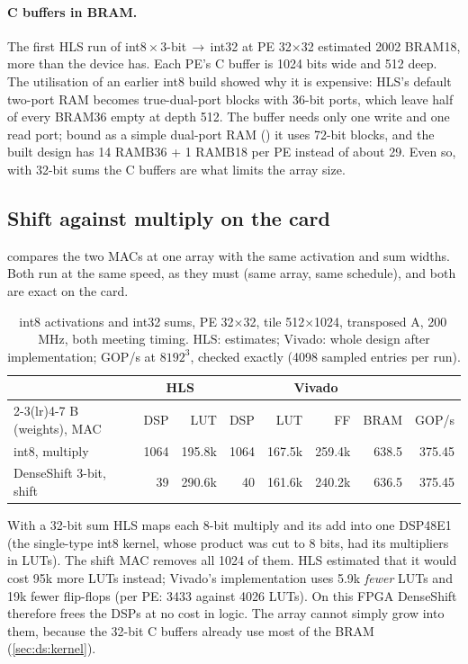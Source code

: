 \paragraph{C buffers in BRAM.} The first HLS run of int8\,\(\times\)\,3-bit\,\(\to\)\,int32 at PE 32\(\times\)32
estimated 2002 BRAM18, more than the device has. Each PE's C buffer is 1024 bits wide and 512 deep. The utilisation of
an earlier int8 build showed why it is expensive: HLS's default two-port RAM becomes true-dual-port blocks with 36-bit
ports, which leave half of every BRAM36 empty at depth 512. The buffer needs only one write and one read port; bound as
a simple dual-port RAM () it uses 72-bit blocks, and the built design has 14 RAMB36 +
1 RAMB18 per PE instead of about 29. Even so, with 32-bit sums the C buffers are what limits the array size.

\subsection{Shift against multiply on the card}
\label{sec:ds:card}
 compares the two MACs at one array with the same activation and sum widths. Both run at the same
speed, as they must (same array, same schedule), and both are exact on the card.

\begin{table}[ht]
\centering\small
\caption{int8 activations and int32 sums, PE 32\(\times\)32, tile 512\(\times\)1024, transposed A, 200\,MHz, both
  meeting timing. HLS: estimates; Vivado: whole design after implementation; GOP/s at \(8192^3\), checked exactly
  (4098 sampled entries per run).}
\label{tab:ds-same}
\begin{tabular}{@{}lrrrrrrr@{}}
\toprule
& \multicolumn{2}{c}{HLS} & \multicolumn{4}{c}{Vivado} & \\
\cmidrule(lr){2-3}\cmidrule(lr){4-7}
B (weights), MAC & DSP & LUT & DSP & LUT & FF & BRAM & GOP/s \\
\midrule
int8, multiply & 1064 & 195.8k & 1064 & 167.5k & 259.4k & 638.5 & 375.45 \\
DenseShift 3-bit, shift & 39 & 290.6k & 40 & 161.6k & 240.2k & 636.5 & 375.45 \\
\bottomrule
\end{tabular}
\end{table}

With a 32-bit sum HLS maps each 8-bit multiply and its add into one DSP48E1 (the single-type int8 kernel, whose
product was cut to 8 bits, had its multipliers in LUTs). The shift MAC removes all 1024 of them. HLS estimated that it
would cost 95k more LUTs instead; Vivado's implementation uses 5.9k \emph{fewer} LUTs and 19k fewer flip-flops (per
PE: 3433 against 4026 LUTs). On this FPGA DenseShift therefore frees the DSPs at no cost in logic. The array cannot
simply grow into them, because the 32-bit C buffers already use most of the BRAM (\cref{sec:ds:kernel}).

